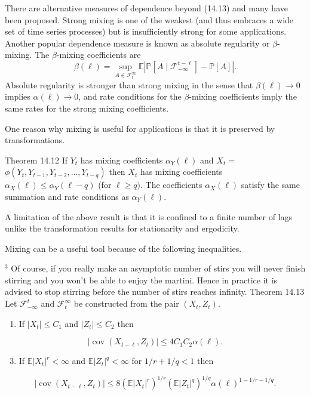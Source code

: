 \documentclass[10pt]{article}
\begin{document}
There are alternative measures of dependence beyond (14.13) and many have been proposed. Strong mixing is one of the weakest (and thus embraces a wide set of time series processes) but is insufficiently strong for some applications. Another popular dependence measure is known as absolute regularity or $\beta$-mixing. The $\beta$-mixing coefficients are
$$
\beta(\ell)=\sup _{A \in \mathscr{F}_{t}^{\infty}} \mathbb{E}\left|\mathbb{P}\left[A \mid \mathscr{F}_{-\infty}^{t-\ell}\right]-\mathbb{P}[A]\right| .
$$
Absolute regularity is stronger than strong mixing in the sense that $\beta(\ell) \rightarrow 0$ implies $\alpha(\ell) \rightarrow 0$, and rate conditions for the $\beta$-mixing coefficients imply the same rates for the strong mixing coefficients.

One reason why mixing is useful for applications is that it is preserved by transformations.

Theorem 14.12 If $Y_{t}$ has mixing coefficients $\alpha_{Y}(\ell)$ and $X_{t}=$ $\phi\left(Y_{t}, Y_{t-1}, Y_{t-2}, \ldots, Y_{t-q}\right)$ then $X_{t}$ has mixing coefficients $\alpha_{X}(\ell) \leq \alpha_{Y}(\ell-q)$ (for $\ell \geq q)$. The coefficients $\alpha_{X}(\ell)$ satisfy the same summation and rate conditions as $\alpha_{Y}(\ell)$.

A limitation of the above result is that it is confined to a finite number of lags unlike the transformation results for stationarity and ergodicity.

Mixing can be a useful tool because of the following inequalities.

${ }^{3}$ Of course, if you really make an asymptotic number of stirs you will never finish stirring and you won't be able to enjoy the martini. Hence in practice it is advised to stop stirring before the number of stirs reaches infinity. Theorem 14.13 Let $\mathscr{F}_{-\infty}^{t}$ and $\mathscr{F}_{t}^{\infty}$ be constructed from the pair $\left(X_{t}, Z_{t}\right)$.

\begin{enumerate}
  \item If $\left|X_{t}\right| \leq C_{1}$ and $\left|Z_{t}\right| \leq C_{2}$ then
\end{enumerate}
$$
\left|\operatorname{cov}\left(X_{t-\ell}, Z_{t}\right)\right| \leq 4 C_{1} C_{2} \alpha(\ell) .
$$

\begin{enumerate}
  \setcounter{enumi}{2}
  \item If $\mathbb{E}\left|X_{t}\right|^{r}<\infty$ and $\mathbb{E}\left|Z_{t}\right|^{q}<\infty$ for $1 / r+1 / q<1$ then
\end{enumerate}
$$
\left|\operatorname{cov}\left(X_{t-\ell}, Z_{t}\right)\right| \leq 8\left(\mathbb{E}\left|X_{t}\right|^{r}\right)^{1 / r}\left(\mathbb{E}\left|Z_{t}\right|^{q}\right)^{1 / q} \alpha(\ell)^{1-1 / r-1 / q} .
$$
\end{document}
